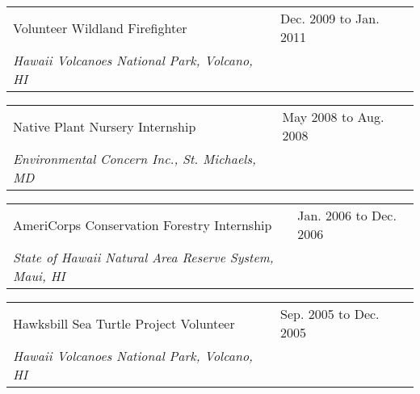 \documentclass[11pt,english]{article}
\providecommand{\tabularnewline}{\\}
\begin{document}
\begin{tabular}{>{\raggedright}p{4in}>{\raggedleft}p{2in}}
Volunteer Wildland Firefighter & Dec. 2009 to Jan. 2011\tabularnewline
\hspace{1.5em}\emph{Hawaii Volcanoes National Park, Volcano, HI}\tabularnewline
\end{tabular}

\begin{tabular}{>{\raggedright}p{4in}>{\raggedleft}p{2in}}
Native Plant Nursery Internship & May 2008 to Aug. 2008 \tabularnewline
\hspace{1.5em}\emph{Environmental Concern Inc., St. Michaels, MD}\tabularnewline
\end{tabular}

\begin{tabular}{>{\raggedright}p{4in}>{\raggedleft}p{2in}}
AmeriCorps Conservation Forestry Internship & Jan. 2006 to Dec. 2006\tabularnewline
\hspace{1.5em}\emph{State of Hawaii Natural Area Reserve System, Maui, HI}\tabularnewline
\end{tabular}

\begin{tabular}{>{\raggedright}p{4in}>{\raggedleft}p{2in}}
Hawksbill Sea Turtle Project Volunteer & Sep. 2005 to Dec. 2005\tabularnewline
\hspace{1.5em}\emph{Hawaii Volcanoes National Park, Volcano, HI}\tabularnewline
\end{tabular}


\end{document}
